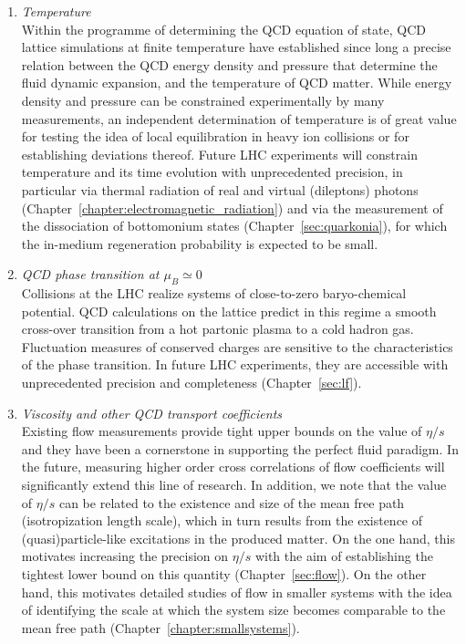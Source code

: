 \documentclass[../report.tex]{subfiles}
\begin{document}
\begin{enumerate}
\item {\it Temperature}\\
Within the programme of determining the QCD equation of state, QCD lattice simulations at finite temperature have established since long a precise relation between the QCD energy density and pressure that determine the fluid dynamic expansion, and the temperature of QCD matter.  While energy density and pressure can be constrained experimentally by many measurements, an independent determination of temperature is of great value for testing the idea of local equilibration in heavy ion collisions or for establishing deviations thereof. Future LHC experiments will constrain  temperature and its time evolution with unprecedented precision, in particular via thermal radiation of real and virtual (dileptons) photons (Chapter~\ref{chapter:electromagnetic_radiation}) and via the measurement of the dissociation of bottomonium states (Chapter~\ref{sec:quarkonia}), for which the in-medium regeneration probability is expected to be small.  
\item {\it QCD phase transition at $\mu_B \simeq 0$}\\ Collisions at the LHC realize systems of close-to-zero baryo-chemical potential. QCD calculations on the lattice predict in this regime a smooth cross-over transition from a hot partonic plasma to a cold hadron gas. Fluctuation measures of conserved charges are sensitive to the characteristics of the phase transition. In future LHC experiments, they are accessible with unprecedented precision and completeness (Chapter~\ref{sec:lf}). 
\item {\it Viscosity and other QCD transport coefficients}\\ Existing flow measurements provide tight upper bounds on the value of $\eta/s$ and they have been a cornerstone in supporting the perfect fluid paradigm. In the future, measuring higher order cross correlations of flow coefficients will significantly extend this line of research.  In addition, we note that the value of $\eta/s$ can be related to the existence and size of the mean free path (isotropization length scale), which in turn results from the existence of (quasi)particle-like excitations in the produced matter. On the one hand, this motivates increasing the precision on $\eta/s$ with the aim of establishing the tightest lower bound on this quantity (Chapter~\ref{sec:flow}). On the other hand, this motivates detailed studies of flow in smaller systems with the idea of identifying the scale at which the system size becomes comparable to the mean free path (Chapter~\ref{chapter:smallsystems}). 

\end{enumerate}
\end{document}
